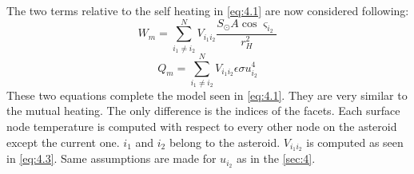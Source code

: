 The two terms relative to the self heating in \autoref{eq:4.1} are now considered following:
\begin{equation}
    W_m=\sum_{i_1\neq i_2}^N V_{i_1i_2}\frac{S_{\odot}A\cos\varsigma_{i_2}}{r_H^2}
    \label{eq:5.1}
\end{equation}
\begin{equation}
    Q_m=\sum_{i_1\neq i_2}^N V_{i_1i_2}\epsilon\sigma u_{i_2}^4
    \label{eq:5.2}
\end{equation}
These two equations complete the model seen in \autoref{eq:4.1}. They are very similar to the mutual heating. The only difference is the indices of the facets. Each surface node temperature is computed with respect to every other node on the asteroid except the current one. $i_1$ and $i_2$ belong to the asteroid. $V_{i_1i_2}$ is computed as seen in \autoref{eq:4.3}. Same assumptions are made for $u_{i_2}$ as in the \autoref{sec:4}.

